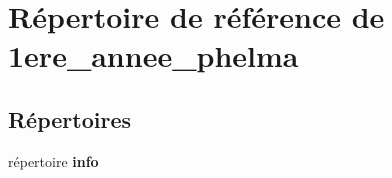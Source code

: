 \section{Répertoire de référence de 1ere\-\_\-annee\-\_\-phelma}
\label{dir_281c60c3068ebcf92bbc0e828b34db66}
\subsection*{Répertoires}
\begin{DoxyCompactItemize}
\item 
répertoire {\bf info}
\end{DoxyCompactItemize}
